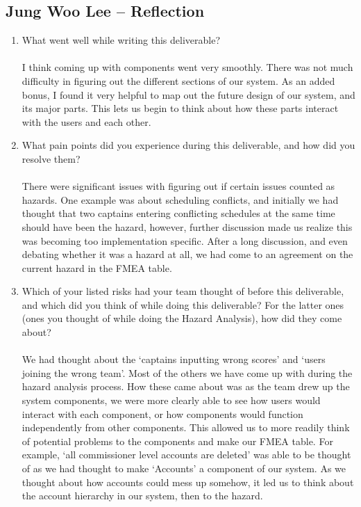 \documentclass{article}
\begin{document}
\subsection*{Jung Woo Lee -- Reflection}

\begin{enumerate}
  \item What went well while writing this deliverable?\\\\
  I think coming up with components went very smoothly. There was not much difficulty in figuring out the different sections of our system. As an added bonus, I found it very helpful to map out the future design of our system, and its major parts. This lets us begin to think about how these parts interact with the users and each other.
  \item What pain points did you experience during this deliverable, and how
  did you resolve them?\\\\
  There were significant issues with figuring out if certain issues counted as hazards. One example was about scheduling conflicts, and initially we had thought that two captains entering conflicting schedules at the same time should have been the hazard, however, further discussion made us realize this was becoming too implementation specific. After a long discussion, and even debating whether it was a hazard at all, we had come to an agreement on the current hazard in the FMEA table. 
  \item Which of your listed risks had your team thought of before this
  deliverable, and which did you think of while doing this deliverable? For
  the latter ones (ones you thought of while doing the Hazard Analysis), how
  did they come about?
  \\\\
  We had thought about the ‘captains inputting wrong scores’ and ‘users joining the wrong team’. Most of the others we have come up with during the hazard analysis process. How these came about was as the team drew up the system components, we were more clearly able to see how users would interact with each component, or how components would function independently from other components. This allowed us to more readily think of potential problems to the components and make our FMEA table. For example, ‘all commissioner level accounts are deleted’ was able to be thought of as we had thought to make ‘Accounts’ a component of our system. As we thought about how accounts could mess up somehow, it led us to think about the account hierarchy in our system, then to the hazard.

\end{enumerate}
\end{document}
